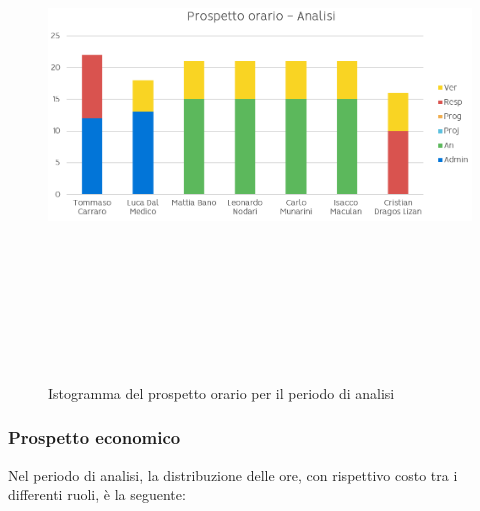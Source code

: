                     \begin{figure}[htbp]
                    	\centering
                        \includegraphics[width=14cm,height=14cm,keepaspectratio]{./img/ProspettoOrario/POAnalisi.png}
                        \caption[Analisi - Istogramma prospetto orario]{Istogramma del prospetto orario per il periodo di analisi}
                    \end{figure}
                

            \subsubsection{Prospetto economico}

                Nel periodo di analisi, la distribuzione delle ore, con rispettivo costo tra i differenti ruoli, è la seguente:

